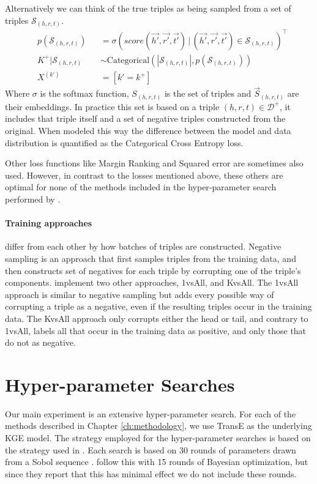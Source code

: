 Alternatively we can think of the true triples as being sampled from a set of triples $\mathcal{S}_{(h,r,t)}$.
\begin{align}
    & p(\bm{\mathcal{S}}_{(h,r,t)})  && = \sigma \left(  score(\vec{h'}, \vec{r'}, \vec{t'}) \,|\, (\vec{h'}, \vec{r'}, \vec{t'}) \in \bm{\mathcal{S}}_{(h,r,t)} \right)^\top
\\
    & K^+ | \bm{\mathcal{S}}_{(h,r,t)} && \sim \text{Categorical}(|\bm{\mathcal{S}}_{(h,r,t)}|, p(\bm{\mathcal{S}}_{(h,r,t)}))
\\
    & X^{(k')} && = [k' = k^+]
\end{align}
Where $\sigma$ is the softmax function, $S_{(h,r,t)}$ is the set of triples and $\vec{S}_{(h,r,t)}$ are their embeddings. In practice this set is based on a triple $(h,r,t) \in \mathcal{D}^+$, it includes that triple itself and a set of negative triples constructed from the original.
When modeled this way the difference between the model and data distribution is quantified as the Categorical Cross Entropy loss.

Other loss functions like Margin Ranking and Squared error are sometimes also used. However, in contrast to the losses mentioned above, these others are optimal for none of the methods included in the hyper-parameter search performed by \citeauthor{ruffinelli_you_2019}.

\paragraph{Training approaches} differ from each other by how batches of triples are constructed. Negative sampling is an approach that first samples triples from the training data, and then constructs set of negatives for each triple by corrupting one of the triple's components. \citeauthor{ruffinelli_you_2019} implement two other approaches, 1vsAll, and KvsAll. The 1vsAll approach is similar to negative sampling but adds every possible way of corrupting a triple as a negative, even if the resulting triples occur in the training data. 
The KvsAll approach only corrupts either the head or tail, and contrary to 1vsAll, labels all that occur in the training data as positive, and only those that do not as negative.

\section{Hyper-parameter Searches}
Our main experiment is an extensive hyper-parameter search. 
For each of the methods described in Chapter \ref{ch:methodology}, we use TransE as the underlying KGE model.
%
The strategy employed for the hyper-parameter searches is based on the strategy used in . Each search is based on 30 rounds of parameters drawn from a Sobol sequence . \citeauthor{ruffinelli_you_2019} follow this with 15 rounds of Bayesian optimization, but since they report that this has minimal effect we do not include these rounds. %


